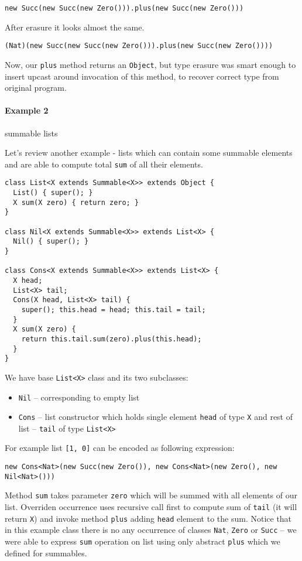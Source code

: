 \documentclass{article}[12pt]
\begin{document}
\begin{verbatim}
new Succ(new Succ(new Zero())).plus(new Succ(new Zero()))
\end{verbatim}
After erasure it looks almost the same.
\begin{verbatim}
(Nat)(new Succ(new Succ(new Zero())).plus(new Succ(new Zero())))
\end{verbatim}

Now, our \texttt{plus} method returns an \texttt{Object}, but
type erasure was smart enough to insert upcast around invocation
of this method, to recover correct type from original program.

\paragraph{Example 2} summable lists

Let's review another example - lists which can contain some
summable elements and are able to compute total \texttt{sum} of
all their elements.

\begin{verbatim}
class List<X extends Summable<X>> extends Object {
  List() { super(); }
  X sum(X zero) { return zero; }
}

class Nil<X extends Summable<X>> extends List<X> {
  Nil() { super(); }
}

class Cons<X extends Summable<X>> extends List<X> {
  X head;
  List<X> tail;
  Cons(X head, List<X> tail) {
    super(); this.head = head; this.tail = tail;
  }
  X sum(X zero) {
    return this.tail.sum(zero).plus(this.head);
  }
}
\end{verbatim}
We have base \texttt{List<X>} class and its two subclasses:
\begin{itemize}
\item \texttt{Nil} -- corresponding to empty list
\item \texttt{Cons} -- list constructor which holds single
  element \texttt{head} of type \texttt{X} and rest of list
   -- \texttt{tail} of type \texttt{List<X>}
\end{itemize}
For example list \texttt{[1, 0]} can be encoded as following
expression:

\begin{verbatim}
new Cons<Nat>(new Succ(new Zero()), new Cons<Nat>(new Zero(), new Nil<Nat>()))
\end{verbatim}

Method \texttt{sum} takes parameter \texttt{zero} which will
be summed with all elements of our list. Overriden occurrence
uses recursive call first to compute sum of \texttt{tail} (it will
return \texttt{X}) and invoke method \texttt{plus} adding
\texttt{head} element to the sum. Notice that in this example
class there is no any occurrence of classes \texttt{Nat},
\texttt{Zero} or \texttt{Succ} -- we were able to express
\texttt{sum} operation on list using only abstract \texttt{plus}
which we defined for summables.
\end{document}
